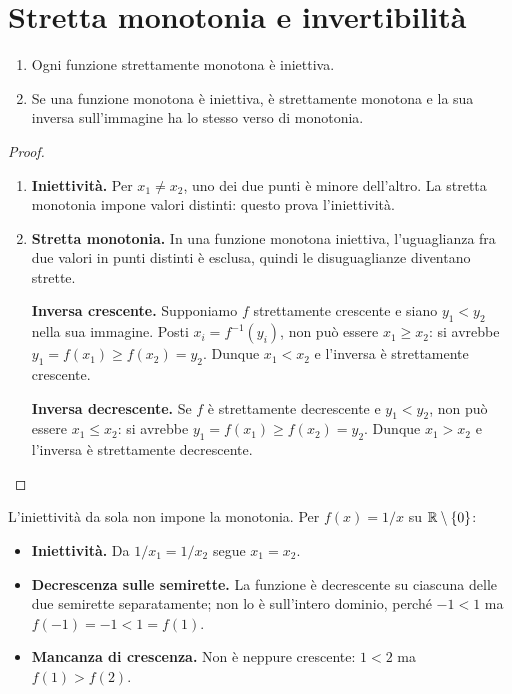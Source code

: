 \section{Stretta monotonia e invertibilità}

\begin{proposizione}
\begin{enumerate}[label=\arabic*.]
\item Ogni funzione strettamente monotona è iniettiva.
\item Se una funzione monotona è iniettiva, è strettamente monotona e la sua inversa sull'immagine ha lo stesso verso di monotonia.
\end{enumerate}
\end{proposizione}
\begin{proof}
\begin{enumerate}[label=\arabic*.]
\item \textbf{Iniettività.} Per $x_1\ne x_2$, uno dei due punti è minore dell'altro. La stretta monotonia impone valori distinti: questo prova l'iniettività.
\item \textbf{Stretta monotonia.} In una funzione monotona iniettiva, l'uguaglianza fra due valori in punti distinti è esclusa, quindi le disuguaglianze diventano strette.

\textbf{Inversa crescente.} Supponiamo $f$ strettamente crescente e siano $y_1<y_2$ nella sua immagine. Posti $x_i=f^{-1}(y_i)$, non può essere $x_1\ge x_2$: si avrebbe $y_1=f(x_1)\ge f(x_2)=y_2$. Dunque $x_1<x_2$ e l'inversa è strettamente crescente.

\textbf{Inversa decrescente.} Se $f$ è strettamente decrescente e $y_1<y_2$, non può essere $x_1\le x_2$: si avrebbe $y_1=f(x_1)\ge f(x_2)=y_2$. Dunque $x_1>x_2$ e l'inversa è strettamente decrescente.
\end{enumerate}
\end{proof}

\begin{osservazione}
L'iniettività da sola non impone la monotonia. Per $f(x)=1/x$ su $\mathbb{R}\setminus\{0\}$:
\begin{itemize}
  \item \textbf{Iniettività.} Da $1/x_1=1/x_2$ segue $x_1=x_2$.
  \item \textbf{Decrescenza sulle semirette.} La funzione è decrescente su ciascuna delle due semirette separatamente; non lo è sull'intero dominio, perché $-1<1$ ma $f(-1)=-1<1=f(1)$.
  \item \textbf{Mancanza di crescenza.} Non è neppure crescente: $1<2$ ma $f(1)>f(2)$.
\end{itemize}
\end{osservazione}

